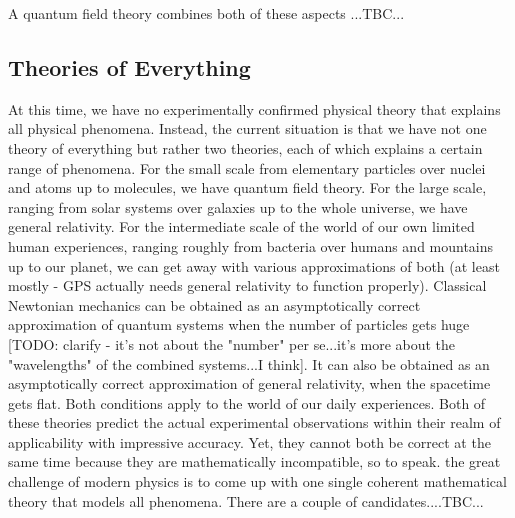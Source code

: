 \medskip
A quantum field theory combines both of these aspects ...TBC...





\subsection{Theories of Everything}
At this time, we have no experimentally confirmed physical theory that explains all physical phenomena. Instead, the current situation is that we have not one theory of everything but rather two theories, each of which explains a certain range of phenomena. For the small scale from elementary particles over nuclei and atoms up to molecules, we have quantum field theory. For the large scale, ranging from solar systems over galaxies up to the whole universe, we have general relativity. For the intermediate scale of the world of our own limited human experiences, ranging roughly from bacteria over humans and mountains up to our planet, we can get away with various approximations of both (at least mostly - GPS actually needs general relativity to function properly). Classical Newtonian mechanics can be obtained as an asymptotically correct approximation of quantum systems when the number of particles gets huge [TODO: clarify - it's not about the "number" per se...it's more about the "wavelengths" of the combined systems...I think]. It can also be obtained as an asymptotically correct approximation of general relativity, when the spacetime gets flat. Both conditions apply to the world of our daily experiences. Both of these theories predict the actual experimental observations within their realm of applicability with impressive accuracy. Yet, they cannot both be correct at the same time because they are mathematically incompatible, so to speak. the great challenge of modern physics is to come up with one single coherent mathematical theory that models all phenomena. There are a couple of candidates....TBC...

